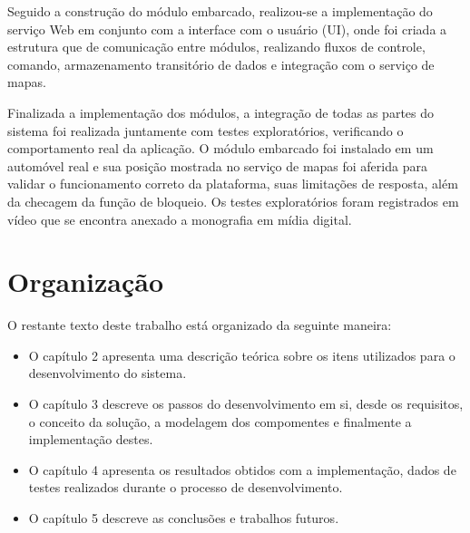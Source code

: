 Seguido a construção do módulo embarcado, realizou-se a implementação do serviço Web em conjunto com a interface com o usuário (UI), onde foi criada a estrutura que de comunicação entre módulos, realizando fluxos de controle, comando, armazenamento transitório de dados e integração com o serviço de mapas.  

Finalizada a implementação dos módulos, a integração de todas as partes do sistema foi realizada juntamente com testes exploratórios, verificando o comportamento real da aplicação. O módulo embarcado foi instalado em um automóvel real e sua posição mostrada no serviço de mapas foi aferida para validar o funcionamento correto da plataforma, suas limitações de resposta, além da checagem da função de bloqueio. Os testes exploratórios foram registrados em vídeo que se encontra anexado a monografia em mídia digital.

\newpage
\section{Organiza\c{c}\~{a}o}

O restante texto deste trabalho está organizado da seguinte maneira:

\begin{itemize}
	\item O capítulo 2 apresenta uma descrição teórica sobre os itens utilizados para o desenvolvimento do sistema.
	\item O capítulo 3 descreve os passos do desenvolvimento em si, desde os requisitos, o conceito da solução, a modelagem dos compomentes e finalmente a implementação destes.
	\item O capítulo 4 apresenta os resultados obtidos com a implementação, dados de testes realizados durante o processo de desenvolvimento.
	\item O capítulo 5 descreve as conclusões e trabalhos futuros.
	
\end{itemize}